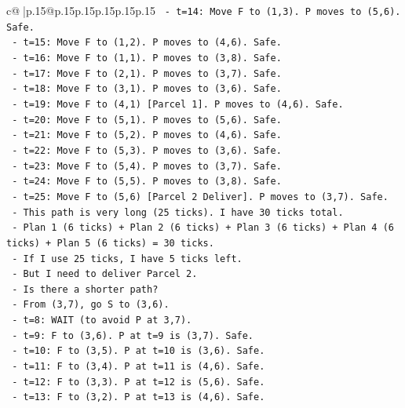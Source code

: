 \documentclass{article}
\begin{document}
{\begin{supertabular}{c@{$\;$}|p{.15\linewidth}@{}p{.15\linewidth}p{.15\linewidth}p{.15\linewidth}p{.15\linewidth}p{.15\linewidth}}
{{{\texttt{     {-} t=14: Move F to (1,3). P moves to (5,6). Safe.} \\
\texttt{     {-} t=15: Move F to (1,2). P moves to (4,6). Safe.} \\
\texttt{     {-} t=16: Move F to (1,1). P moves to (3,8). Safe.} \\
\texttt{     {-} t=17: Move F to (2,1). P moves to (3,7). Safe.} \\
\texttt{     {-} t=18: Move F to (3,1). P moves to (3,6). Safe.} \\
\texttt{     {-} t=19: Move F to (4,1) {[}Parcel 1{]}. P moves to (4,6). Safe.} \\
\texttt{     {-} t=20: Move F to (5,1). P moves to (5,6). Safe.} \\
\texttt{     {-} t=21: Move F to (5,2). P moves to (4,6). Safe.} \\
\texttt{     {-} t=22: Move F to (5,3). P moves to (3,6). Safe.} \\
\texttt{     {-} t=23: Move F to (5,4). P moves to (3,7). Safe.} \\
\texttt{     {-} t=24: Move F to (5,5). P moves to (3,8). Safe.} \\
\texttt{     {-} t=25: Move F to (5,6) {[}Parcel 2 Deliver{]}. P moves to (3,7). Safe.} \\
\texttt{     {-} This path is very long (25 ticks). I have 30 ticks total.} \\
\texttt{     {-} Plan 1 (6 ticks) + Plan 2 (6 ticks) + Plan 3 (6 ticks) + Plan 4 (6 ticks) + Plan 5 (6 ticks) = 30 ticks.} \\
\texttt{     {-} If I use 25 ticks, I have 5 ticks left.} \\
\texttt{     {-} But I need to deliver Parcel 2.} \\
\texttt{     {-} Is there a shorter path?} \\
\texttt{     {-} From (3,7), go S to (3,6).} \\
\texttt{     {-} t=8: WAIT (to avoid P at 3,7).} \\
\texttt{     {-} t=9: F to (3,6). P at t=9 is (3,7). Safe.} \\
\texttt{     {-} t=10: F to (3,5). P at t=10 is (3,6). Safe.} \\
\texttt{     {-} t=11: F to (3,4). P at t=11 is (4,6). Safe.} \\
\texttt{     {-} t=12: F to (3,3). P at t=12 is (5,6). Safe.} \\
\texttt{     {-} t=13: F to (3,2). P at t=13 is (4,6). Safe.} \\
}}}
\end{supertabular}}
\end{document}
